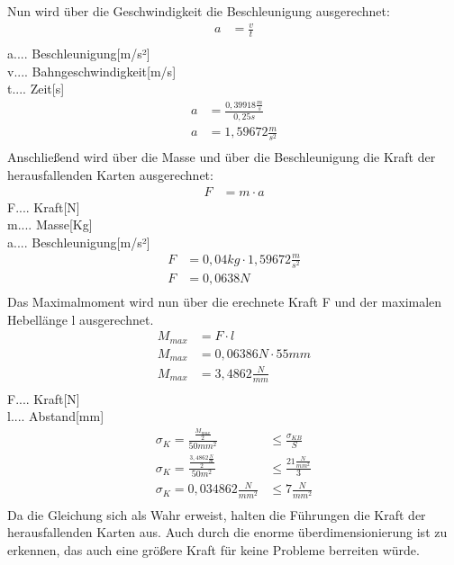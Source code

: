 Nun wird über die Geschwindigkeit die Beschleunigung ausgerechnet:
\begin{align*}
a &= \frac{v}{t}\\
\end{align*}
a.... Beschleunigung[m/s²]\\
v.... Bahngeschwindigkeit[m/s]\\
t.... Zeit[s]\\
\begin{align*}
a &= \frac{0,39918\tfrac{m}{s}}{0,25s}\\
a &= 1,59672\tfrac{m}{s^{2}}\\
\end{align*}
Anschließend wird über die Masse und über die Beschleunigung die Kraft der herausfallenden Karten ausgerechnet:
\begin{align*}
F &= m \cdot a
\end{align*}
F.... Kraft[N]\\
m.... Masse[Kg]\\
a.... Beschleunigung[m/s²]\\
\begin{align*}
F &= 0,04 kg \cdot 1,59672\tfrac{m}{s^{2}}\\
F &= 0,0638N\\
\end{align*}
Das Maximalmoment wird nun über die erechnete Kraft F und der maximalen Hebellänge l ausgerechnet.
\begin{align*}
M_{max} &= F\cdot l\\
M_{max} &= 0,06386N\cdot 55mm\\
M_{max} &= 3,4862\tfrac{N}{mm}\\
\end{align*}
F.... Kraft[N]\\
l.... Abstand[mm]\\

\begin{align*}
\sigma _{K} = {\frac{\frac{M_{max}}{2}}{50mm^{2}}} &\leq \frac{\sigma _{KB}}{S}\\
\sigma _{K}= \frac{\frac{3,4862\tfrac{N}{m}}{2}}{50m^{2}} &\leq  \frac{21 \tfrac{N}{mm^{2}}}{3}\\
\sigma _{K} = 0,034862 \tfrac{N}{mm^{2}} &\leq 7 \tfrac{N}{mm^{2}}\\
\end{align*}
Da die Gleichung sich als Wahr erweist, halten die Führungen die Kraft der herausfallenden Karten
aus. Auch durch die enorme überdimensionierung ist zu erkennen, das auch eine größere Kraft für
keine Probleme berreiten würde.

